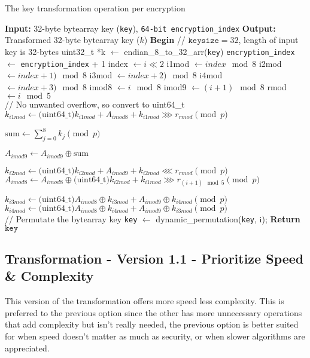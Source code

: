 \documentclass[fleqn, a4paper,12pt]{article}
\newcommand{\COMMENT}[1]{\State \textcolor[HTML]{003e57}{// #1}}
\begin{document}
\begin{algorithm}[H] %
\caption{The key transformation operation per encryption}
\begin{algorithmic}[1]  %
\State \textbf{Input:} 32-byte bytearray key (\texttt{key}), \texttt{64-bit encryption\_index}
\State \textbf{Output:} Transformed 32-byte bytearray key ($k$)
\State \textbf{Begin}
\COMMENT{$\texttt{keysize} = 32$, length of input key is 32-bytes}
\State uint32\_t *k $\gets$ endian\_8\_to\_32\_arr(\texttt{key})
\State \texttt{encryption\_index} $\gets$ \texttt{encryption\_index} + 1
	\State index $\gets i \ll 2$
	\State i1mod $\gets index \mod 8$
	\State i2mod $\gets index+1) \mod 8$
	\State i3mod $\gets index+2) \mod 8$
	\State i4mod $\gets index+3) \mod 8$
	\State imod8 $\gets i \mod 8$
	\State imod9 $\gets (i+1) \mod 8$
	\State rmod $\gets i \mod 5$ \\

	\COMMENT{No unwanted overflow, so convert to uint64\_t}
	\State $k_{i1mod} \gets \text{(uint64\_t)} k_{i1mod} + A_{imod8} + k_{i1mod} \ggg r_{rmod}  \pmod p $

	\State $ \text{sum} \gets \displaystyle \sum_{j=0}^8 k_j \pmod p $

	\State $A_{imod9} \gets A_{imod9} \oplus \text{sum}$

	\State $k_{i2mod} \gets \text{(uint64\_t)} k_{i2mod} + A_{imod9} + k_{i2mod} \lll r_{rmod} \pmod p$
	\State $A_{imod8} \gets A_{imod8} \oplus \text{(uint64\_t)} k_{i2mod} + k_{i1mod} \ggg r_{(i+1) \mod 5} \pmod p$

	\State $k_{i3mod} \gets \text{(uint64\_t)} A_{imod8} \oplus k_{i3mod} + A_{imod9} \oplus k_{i4mod} \pmod p$
	\State $k_{i4mod} \gets  \text{(uint64\_t)} A_{imod8} \oplus k_{i4mod} + A_{imod9} \oplus k_{i3mod} \pmod p$ \\

	\COMMENT{Permutate the bytearray key}
	\State \texttt{key} $\gets$ dynamic\_permutation(\texttt{key}, i);
\EndFor
\State \textbf{Return} $\texttt{key}$
\end{algorithmic}
\end{algorithm}

\subsection{Transformation - Version 1.1 - Prioritize Speed \& Complexity}

This version of the transformation offers more speed less complexity. This is preferred to the previous option since the other has more unnecessary operations that add complexity but isn't really needed, the previous option is better suited for when speed doesn't matter as much as security, or when slower algorithms are appreciated.
\end{document}
